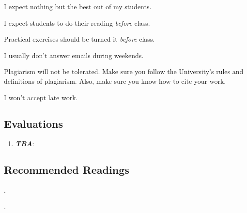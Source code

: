 \documentclass[letterpaper]{article}
\renewenvironment{itemize}{
  \begin{list}{}{
    \setlength{\leftmargin}{1.5em}
  }
}{
  \end{list}
}
\begin{document}
I expect nothing but the best out of my students. 

\begin{itemize}
     \item[$\circ$] I expect students to do their reading \emph{before} class.
     \item[$\circ$] Practical exercises should be turned it \emph{before} class. 

  \item[$\circ$] I usually don't answer emails during weekends. 
\end{itemize}


\begin{itemize}
  \item[{\color{red}\Pointinghand}] Plagiarism will not be tolerated. Make sure you follow the University's rules and definitions of plagiarism. Also, make sure you know how to cite your work. 

  \item[{\color{red}\Pointinghand}] I won't accept late work.

\end{itemize}

\subsection*{Evaluations}

\begin{enumerate}
  \item {\bf \emph{TBA}}: %
\end{enumerate}



\subsection*{Recommended Readings}

\begin{itemize} 

        \item[$\diamond$] .

        \item[$\diamond$] .


\end{itemize} 
\end{document}
